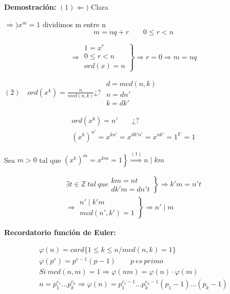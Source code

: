 \documentclass{article}
\begin{document}
\textbf{Demostración:} $(1)\Leftarrow)$ Clara

$\Rightarrow) x^m=1$ dividimos m entre n
\begin{equation*}
m=nq+r \qquad 0 \leq r < n
\end{equation*}

\begin{equation*}
\Rightarrow \left. \begin{array}{c}
1=x^r \\
0 \leq r < n \\
ord(x)=n
\end{array} \right\rbrace \Rightarrow r=0 \Rightarrow m=nq
\end{equation*}

$(2) \quad ord(x^k)=\frac{n}{mcd(n,k)}$¿? $\left. \begin{array}{c} d=mcd(n,k)\\n=dn'\\k=dk'\end{array} \right.$

\begin{gather*}
ord(x^k)=n'\qquad ¿? \\
(x^k)^{n'}=x^{kn'}=x^{dk'n'}=x^{nk'}=1^{k'}=1
\end{gather*}

Sea $m>0$ tal que $\left.(x^k)^m=x^{km}=1 \right\rbrace \overset{(1)}{\Rightarrow} n\mid km$

\begin{gather*}
\exists t\in \mathbb{Z} \: tal \: que \left. \begin{array}{c}
km=nt \\
dk'm=dn't
\end{array}\right\rbrace \Rightarrow k'm=n't \\
\Rightarrow \left. \begin{array}{c}
n'\mid k'm \\
mcd(n',k')=1
\end{array} \right\rbrace \Rightarrow n'\mid m
\end{gather*}

\textbf{Recordatorio función de Euler:}

\begin{gather*}
\varphi(n)=card\{1\leq k\leq n/mcd(n,k)=1\} \\
\varphi(p^e)=p^{e-1}(p-1) \qquad p\:es\:primo \\
Si\:mcd(n,m)=1\Rightarrow \varphi(nm)=\varphi(n)\cdot \varphi(m) \\
n=p_1^{e_1}\ldots p_k^{e_k}\Rightarrow \varphi(n)=p_1^{e_1-1}\ldots p_k^{e_k-1}(p_1-1)\ldots(p_k-1)
\end{gather*}
\end{document}

